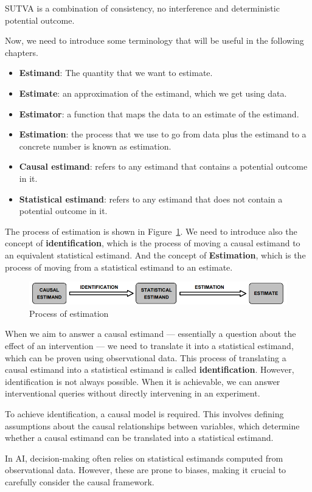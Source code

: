 SUTVA is a combination of consistency, no interference and deterministic potential
outcome.

Now, we need to introduce some terminology that will be useful in the following
chapters.
\begin{itemize}
    \item \textbf{Estimand}: The quantity that we want to estimate.
    \item \textbf{Estimate}: an approximation of the estimand, which we get
          using data.
    \item \textbf{Estimator}: a function that maps the data to an estimate of the
          estimand.
    \item \textbf{Estimation}: the process that we use to go from data plus the
          estimand to a concrete number is known as estimation.
    \item \textbf{Causal estimand}: refers to any estimand that contains a potential
          outcome in it.
    \item \textbf{Statistical estimand}: refers to any estimand that does not contain
          a potential outcome in it.
\end{itemize}

The process of estimation is shown in Figure~\ref{fig:pipeline}. We need to
introduce also the concept of \textbf{identification}, which is the process of
moving a causal estimand to an equivalent statistical estimand. And the concept
of \textbf{Estimation}, which is the process of moving from a statistical estimand
to an estimate.
\begin{figure}[!ht]
    \centering
    \includegraphics[width=\textwidth]{img/potential_outcomes/process.png}
    \caption{Process of estimation}
    \label{fig:pipeline}
\end{figure}

When we aim to answer a causal estimand — essentially a question about the effect
of an intervention — we need to translate it into a statistical estimand, which
can be proven using observational data. This process of translating a causal
estimand into a statistical estimand is called \textbf{identification}. However,
identification is not always possible. When it is achievable, we can answer
interventional queries without directly intervening in an experiment.

To achieve identification, a causal model is required. This involves defining
assumptions about the causal relationships between variables, which determine
whether a causal estimand can be translated into a statistical estimand.

In AI, decision-making often relies on statistical estimands computed from
observational data. However, these are prone to biases, making it crucial to
carefully consider the causal framework.